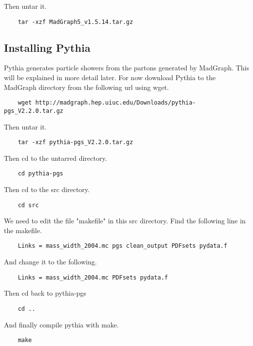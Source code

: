 \documentclass{article}
\begin{document}
Then untar it.

\begin{verbatim}
	tar -xzf MadGraph5_v1.5.14.tar.gz
\end{verbatim}

\subsection {Installing Pythia}

Pythia generates particle showers from the partons generated by MadGraph. This will be explained in more detail later. For now download Pythia to the MadGraph directory from the following url using wget.

\begin{verbatim}
	wget http://madgraph.hep.uiuc.edu/Downloads/pythia-pgs_V2.2.0.tar.gz
\end{verbatim}

Then untar it.

\begin{verbatim}
	tar -xzf pythia-pgs_V2.2.0.tar.gz
\end{verbatim}

Then cd to the untarred directory.

\begin{verbatim}
	cd pythia-pgs
\end{verbatim}

Then cd to the src directory.

\begin{verbatim}
	cd src
\end{verbatim}

We need to edit the file "makefile" in this src directory. Find the following line in the makefile.

\begin{verbatim}
	Links = mass_width_2004.mc pgs clean_output PDFsets pydata.f
\end{verbatim}

And change it to the following.

\begin{verbatim}
	Links = mass_width_2004.mc PDFsets pydata.f
\end{verbatim}

Then cd back to pythia-pgs

\begin{verbatim}
	cd ..
\end{verbatim}

And finally compile pythia with make.

\begin{verbatim}
	make
\end{verbatim}
\end{document}
